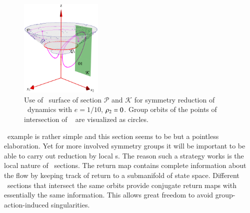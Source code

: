 \begin{figure}[ht]
\begin{center}
  \includegraphics[width=0.35\textwidth]{../figs/CLEmartini}
\end{center}
\caption{
Use of \Poincare\ surface of section $\mathcal{P}$ and
{\csection} $\mathcal{K}$ for symmetry reduction of \CLe\
dynamics with $e=1/10$, $\rho_2=0$. Group orbits of the
points of intersection of \rpo\  are visualized as
circles.
    }
\label{fig:CLEmartini}
\end{figure}

\CLe\ example is rather simple and this section seems to be but a pointless elaboration.
Yet for more involved symmetry groups it will be important to be able to
carry out reduction by local {\csection s}. The reason such a strategy works
is the local nature of \Poincare\ sections. The return map contains complete
information about the flow by keeping track of return to a submanifold of state space.
Different \Poincare\ sections that intersect the same orbits provide conjugate return
maps with essentially the same information. This allows great freedom to avoid group-action-induced
singularities.